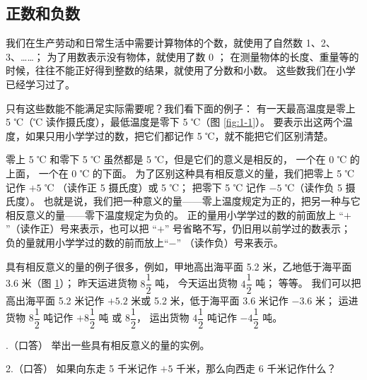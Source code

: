\subsection{正数和负数}\label{subsec:1-1}

我们在生产劳动和日常生活中需要计算物体的个数，就使用了自然数 1、2、3、……；
为了用数表示没有物体，就使用了数 0 ；
在测量物体的长度、重量等的时候，往往不能正好得到整数的结果，就使用了分数和小数。
这些数我们在小学已经学习过了。

只有这些数能不能满足实际需要呢？我们看下面的例子：
有一天最高温度是零上 5 ℃（℃ 读作摄氏度），最低温度是零下 5 ℃（图 \ref{fig:1-1}）。
要表示出这两个温度，如果只用小学学过的数，把它们都记作 5 ℃，就不能把它们区别清楚。

\begin{figure}[htbp]
    \centering
    \begin{minipage}{7cm}
    \centering
    
    \caption{}\label{fig:1-1}
    \end{minipage}
    \qquad
    \begin{minipage}{7cm}
    \centering
    
    \caption{}\label{fig:1-2}
    \end{minipage}
\end{figure}

零上 5 ℃ 和零下 5 ℃ 虽然都是 5 ℃，但是它们的意义是相反的，
一个在 0 ℃ 的上面， 一个在 0 ℃ 的下面。
为了区别这种具有相反意义的量，我们把零上 5 ℃ 记作 $+5$ ℃ （读作正 5 摄氏度）或 5 ℃；
把零下 5 ℃ 记作 $-5$ ℃（读作负 5 摄氏度）。
也就是说，我们把一种意义的量——零上温度规定为正的，把另一种与它相反意义的量——零下温度规定为负的。
正的量用小学学过的数的前面放上 “$+$”（读作正）号来表示，也可以把 “$+$” 号省略不写，仍旧用以前学过的数表示；
负的量就用小学学过的数的前而放上“$-$” （读作负）号来表示。

\begin{enhancedline}
具有相反意义的量的例子很多，例如，甲地高出海平面 5.2 米，乙地低于海平面 3.6 米（图 \ref{fig:1-2}）；
昨天运进货物 $8\dfrac{1}{2}$ 吨， 今天运出货物 $4\dfrac{1}{2}$ 吨； 等等。
我们可以把高出海平面 5.2 米记作 $+5.2$ 米或 5.2 米，低于海平面 3.6 米记作 $-3.6$ 米；
运进货物 $8\dfrac{1}{2}$ 吨记作 $+8\dfrac{1}{2}$ 吨 或 $8\dfrac{1}{2}$，
运出货物 $4\dfrac{1}{2}$ 吨记作  $-4\dfrac{1}{2}$ 吨。
\end{enhancedline}


.（口答） 举出一些具有相反意义的量的实例。

2.（口答） 如果向东走 5 千米记作 $+5$ 千米，那么向西走 6 千米记作什么？

